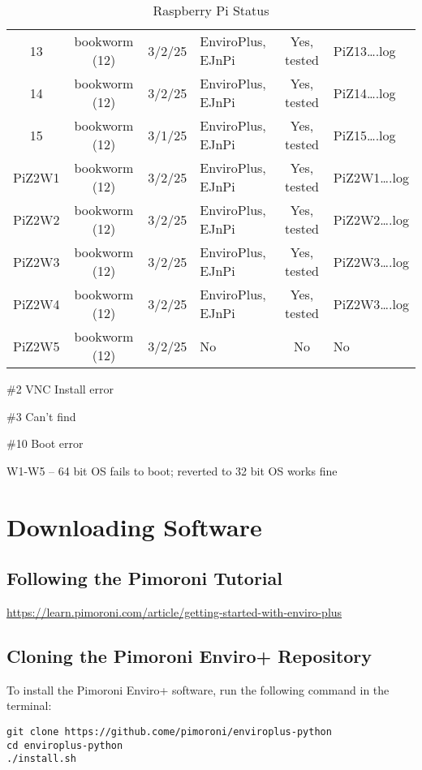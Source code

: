 \documentclass{article}
\begin{document}
\begin{table}[h!]
\begin{center}
\begin{tabular}{|c|c|c|p{2.3cm}|c| l|}
13 & bookworm (12)    & 3/2/25 & EnviroPlus, EJnPi & Yes, tested & PiZ13\ldots.log \\
14 & bookworm (12)    & 3/2/25 & EnviroPlus, EJnPi & Yes, tested & PiZ14\ldots.log  \\
15 & bookworm (12)    & 3/1/25 & EnviroPlus, EJnPi & Yes, tested & PiZ15\ldots.log \\
PiZ2W1 & bookworm (12)& 3/2/25  & EnviroPlus, EJnPi & Yes, tested & PiZ2W1\ldots.log \\
PiZ2W2 & bookworm (12)& 3/2/25  & EnviroPlus, EJnPi & Yes, tested & PiZ2W2\ldots.log \\
PiZ2W3 & bookworm (12)& 3/2/25  & EnviroPlus, EJnPi & Yes, tested & PiZ2W3\ldots.log \\
PiZ2W4 & bookworm (12)& 3/2/25  & EnviroPlus, EJnPi & Yes, tested & PiZ2W3\ldots.log \\
PiZ2W5 & bookworm (12)& 3/2/25  & No & No & No \\
\hline
\end{tabular}
\end{center}
\caption{Raspberry Pi Status}
\label{table:1}
\end{table}

\#2 VNC Install error

\#3 Can't find

\#10 Boot error

W1-W5 -- 64 bit OS fails to boot; reverted to 32 bit OS works fine


\section{Downloading Software}

\subsection{Following the Pimoroni Tutorial}

\url{https://learn.pimoroni.com/article/getting-started-with-enviro-plus}

\subsection{Cloning the Pimoroni Enviro+ Repository}

To install the Pimoroni Enviro+ software, run the following command in the terminal:

\begin{verbatim}
git clone https://github.come/pimoroni/enviroplus-python
cd enviroplus-python
./install.sh
\end{verbatim}
\end{document}
